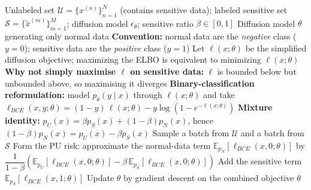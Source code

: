 \documentclass{article}
\begin{document}
\begin{algorithm}[!h]
\renewcommand{\algorithmicrequire}{\textbf{Input:}} %
\renewcommand{\algorithmicensure}{\textbf{Output:}} %
	\caption{Positive-unlabeled diffusion models (preventing sensitive data generation)} %
	\begin{algorithmic}[1] %
	    \REQUIRE
	    Unlabeled set $\mathcal{U}=\{x^{(n)}\}_{n=1}^{N}$ (contains sensitive data);
	    labeled sensitive set $\mathcal{S}=\{\tilde{x}^{(m)}\}_{m=1}^{M}$;
	    diffusion model $\epsilon_{\theta}$; sensitive ratio $\beta\in[0,1]$
	    \ENSURE
	    Diffusion model $\theta$ generating only normal data
	    \STATE \textbf{Convention:} normal data are the \emph{negative} class ($y=0$);
	    sensitive data are the \emph{positive} class ($y=1$) %
	    \STATE Let $\ell(x;\theta)$ be the simplified diffusion objective; maximizing the ELBO
	    is equivalent to minimizing $\ell(x;\theta)$
	    \STATE \textbf{Why not simply maximise $\ell$ on sensitive data:} $\ell$ is bounded below
	    but unbounded above, so maximising it diverges %
	    \STATE \textbf{Binary-classification reformulation:} model
	    $p_{\theta}(y\mid x)$ through $\ell(x;\theta)$ and take
	    \STATE \quad $\ell_{BCE}(x,y;\theta)=(1-y)\,\ell(x;\theta)-y\log\!\left(1-e^{-\ell(x;\theta)}\right)$ %
	    \STATE \textbf{Mixture identity:} $p_{U}(x)=\beta p_{S}(x)+(1-\beta)p_{N}(x)$, hence
	    \STATE \quad $(1-\beta)p_{N}(x)=p_{U}(x)-\beta p_{S}(x)$ %
	    \STATE Sample a batch from $\mathcal{U}$ and a batch from $\mathcal{S}$
	    \STATE Form the PU risk: approximate the normal-data term
	    $\mathbb{E}_{p_{N}}\!\left[\ell_{BCE}(x,0;\theta)\right]$ by
	    $\dfrac{1}{1-\beta}\left(\mathbb{E}_{p_{U}}\!\left[\ell_{BCE}(x,0;\theta)\right]
	    -\beta\,\mathbb{E}_{p_{S}}\!\left[\ell_{BCE}(x,0;\theta)\right]\right)$ %
	    \STATE Add the sensitive term $\mathbb{E}_{p_{S}}\!\left[\ell_{BCE}(x,1;\theta)\right]$
	    \STATE Update $\theta$ by gradient descent on the combined objective
	    \ENDWHILE
		\RETURN $\theta$
	\end{algorithmic}
\end{algorithm}
\end{document}
